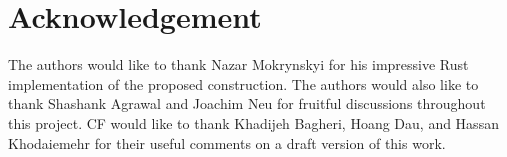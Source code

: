 \documentclass[conference]{IEEEtran}
\begin{document}
\begin{comment}
\textbf{Part II: the actual MASK function}



\textbf{Part III: 'security' of the PoAS in the concrete blockchain design}
(if we see fit this may be combined with Part II)


Comments (for ourselves as we discuss this):

- The only subtle issue is that some costs are amortised among many sectors, like the hardware (even though compute hardware is modeled to be 0 cost for the attacker).

- How we measure cost: we have the freedom to define "cost of storage" as we wish, but we should make sure that it is well defined. Since hardware storage and plotting is amortised among many challenges, the formal definition should not depend on these.

- explain what we mean by cost of storage: keep abstract -- the cost captures "whatever the overall cost is": includes HD cost, plotting -- we can break into fixed + ongoing costs

- if we succeed in making the claim generic enough then the conclusion holds for \textit{any time frame} in which the (honest) farmer decide to spend their entire token budget (that is, the honest farmer can plot a single sector and let it consume expense token "slowly" or she can plot as many sectors as the storage he has let her, consuming more tokens).
\end{comment}


\section*{Acknowledgement}
The authors would like to thank Nazar Mokrynskyi for his impressive Rust implementation of the proposed construction. The authors would also like to thank
Shashank Agrawal and Joachim Neu for fruitful discussions throughout this project. CF would like to thank Khadijeh Bagheri, Hoang Dau, and Hassan Khodaiemehr for their useful comments on a draft version of this work.
\end{document}
